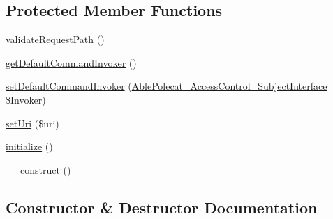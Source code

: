 \subsection*{Protected Member Functions}
\begin{DoxyCompactItemize}
\item 
\hyperlink{class_able_polecat___resource_abstract_a285e624ef8874265991ea3478a7cd301}{validate\+Request\+Path} ()
\item 
\hyperlink{class_able_polecat___resource_abstract_a60be366090fa500d8062c7dfc40bfaf6}{get\+Default\+Command\+Invoker} ()
\item 
\hyperlink{class_able_polecat___resource_abstract_a8af7037413ce56303d66df3b83c9f6d3}{set\+Default\+Command\+Invoker} (\hyperlink{interface_able_polecat___access_control___subject_interface}{Able\+Polecat\+\_\+\+Access\+Control\+\_\+\+Subject\+Interface} \$Invoker)
\item 
\hyperlink{class_able_polecat___resource_abstract_ad259dd848ddd1f85513d77f16684564e}{set\+Uri} (\$uri)
\item 
\hyperlink{class_able_polecat___resource_abstract_a91098fa7d1917ce4833f284bbef12627}{initialize} ()
\item 
\hyperlink{class_able_polecat___resource_abstract_a095c5d389db211932136b53f25f39685}{\+\_\+\+\_\+construct} ()
\end{DoxyCompactItemize}


\subsection{Constructor \& Destructor Documentation}
\hypertarget{class_able_polecat___resource_abstract_a095c5d389db211932136b53f25f39685}{}

